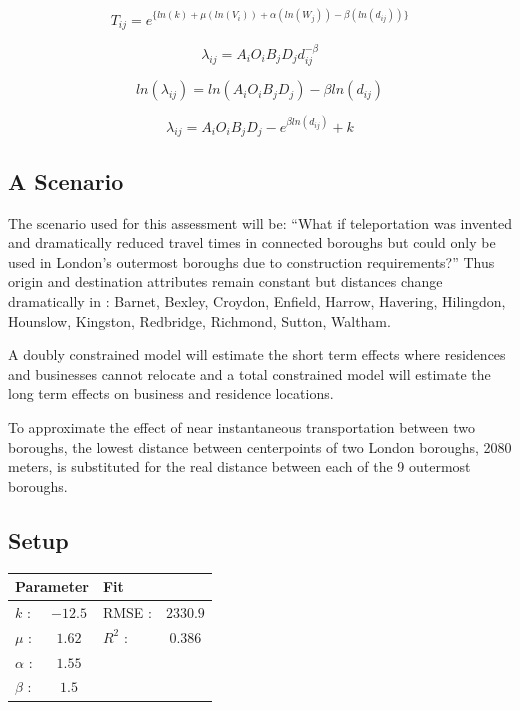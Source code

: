 \documentclass[11pt]{article} %
\begin{document}

\begin{equation}
T_{ij} = e^ { \{ ln(k) + \mu (ln(V_i)) +  \alpha( ln(W_j)) - \beta (ln(d_{ij})) \}}
\end{equation}


\begin{equation}
\lambda_{ij} = A_i O_i  B_j D_j d_{ij}^{-\beta}
\end{equation}

\begin{equation}
ln(\lambda_{ij}) = ln(A_i O_i  B_j D_j) - \beta ln( d_{ij})
\end{equation}


\begin{equation}
\lambda_{ij} = A_i O_i  B_j D_j - e ^{ \beta ln( d_{ij})} + k
\end{equation}



\subsection{A Scenario}

The scenario used for this assessment will be: ``What if teleportation  was invented and dramatically reduced travel times in connected boroughs but could only be used in London's outermost boroughs due to construction requirements?'' Thus origin and destination attributes remain constant but distances change dramatically in : Barnet, Bexley, Croydon, Enfield, Harrow, Havering, Hilingdon, Hounslow, Kingston, Redbridge, Richmond, Sutton, Waltham. 

A doubly constrained model will estimate the short term effects where residences and businesses cannot relocate and a total constrained model will estimate the long term effects on business and residence locations. 

To approximate the effect of near instantaneous transportation between two boroughs, the lowest distance between centerpoints of two London boroughs, 2080 meters, is substituted for the real distance between each of the 9 outermost boroughs. 

\subsection{Setup}


\begin{table}
\centering
\begin{tabular}{lclc}
 \multicolumn{2}{l}{Parameter} 	& \multicolumn{2}{l}{Fit } \\ \hline	 
 $k$ : 		& $-12.5$ 	& RMSE :	&  $2330.9$	  	\\
 $\mu$ :	& $1.62$	& $R^2$ :	&  	$0.386$  	\\
 $\alpha$ :	& $1.55$	&  			&  	  			\\
 $\beta$ :	& $1.5$	& 	 		&
\end{tabular}
\label{unconstrained}
\end{table} 
\end{document}
